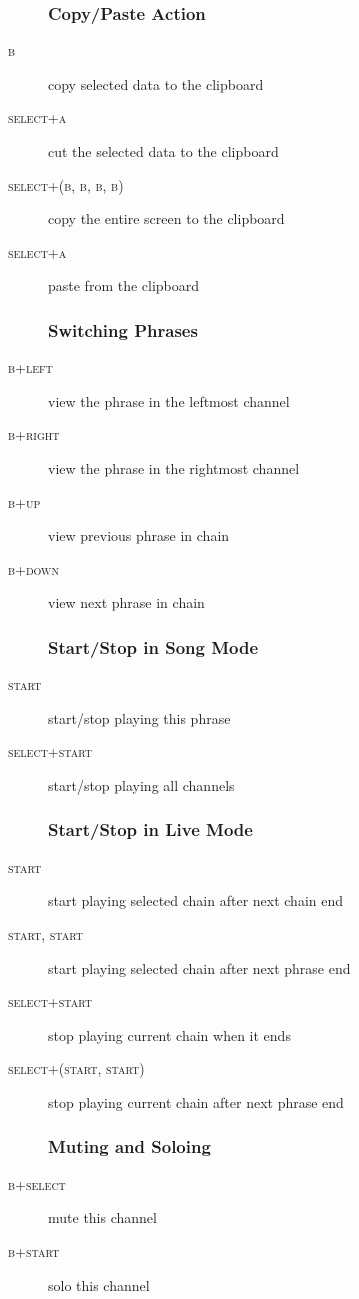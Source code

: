\begin{description}
\subsubsection{Copy/Paste Action}
\item[\textsc{b}] copy selected data to the clipboard
\item[\textsc{select+a}] cut the selected data to the clipboard

\item[\textsc{select+(b, b, b, b)}] copy the entire screen to the clipboard
\item[\textsc{select+a}] paste from the clipboard

\subsubsection{Switching Phrases}
\item[\textsc{b+left}] view the phrase in the leftmost channel
\item[\textsc{b+right}] view the phrase in the rightmost channel
\item[\textsc{b+up}] view previous phrase in chain
\item[\textsc{b+down}] view next phrase in chain

\subsubsection{Start/Stop in Song Mode}

\item[\textsc{start}] start/stop playing this phrase
\item[\textsc{select+start}] start/stop playing all channels

\subsubsection{Start/Stop in Live Mode}
\item[\textsc{start}] start playing selected chain after next chain end
\item[\textsc{start, start}] start playing selected chain after next phrase end
\item[\textsc{select+start}] stop playing current chain when it ends
\item[\textsc{select+(start, start)}] stop playing current chain after next phrase end

\subsubsection{Muting and Soloing}
\item[\textsc{b+select}] mute this channel
\item[\textsc{b+start}] solo this channel
\end{description}



